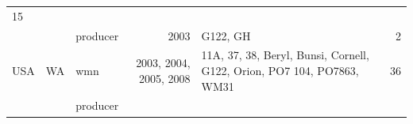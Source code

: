 \begin{longtable}[]{@{}lllrlr@{}}
\begin{minipage}[t]{0.04\columnwidth}
15\strut
\end{minipage}\tabularnewline
\begin{minipage}[t]{0.11\columnwidth}\raggedright\strut
\strut
\end{minipage} & \begin{minipage}[t]{0.08\columnwidth}\raggedright\strut
\strut
\end{minipage} & \begin{minipage}[t]{0.12\columnwidth}\raggedright\strut
producer\strut
\end{minipage} & \begin{minipage}[t]{0.19\columnwidth}\raggedleft\strut
2003\strut
\end{minipage} & \begin{minipage}[t]{0.29\columnwidth}\raggedright\strut
G122, GH\strut
\end{minipage} & \begin{minipage}[t]{0.04\columnwidth}\raggedleft\strut
2\strut
\end{minipage}\tabularnewline
\begin{minipage}[t]{0.11\columnwidth}\raggedright\strut
USA\strut
\end{minipage} & \begin{minipage}[t]{0.08\columnwidth}\raggedright\strut
WA\strut
\end{minipage} & \begin{minipage}[t]{0.12\columnwidth}\raggedright\strut
wmn\strut
\end{minipage} & \begin{minipage}[t]{0.19\columnwidth}\raggedleft\strut
2003, 2004, 2005, 2008\strut
\end{minipage} & \begin{minipage}[t]{0.29\columnwidth}\raggedright\strut
11A, 37, 38, Beryl, Bunsi, Cornell, G122, Orion, PO7 104, PO7863,
WM31\strut
\end{minipage} & \begin{minipage}[t]{0.04\columnwidth}\raggedleft\strut
36\strut
\end{minipage}\tabularnewline
\begin{minipage}[t]{0.11\columnwidth}\raggedright\strut
\strut
\end{minipage} & \begin{minipage}[t]{0.08\columnwidth}\raggedright\strut
\strut
\end{minipage} & \begin{minipage}[t]{0.12\columnwidth}\raggedright\strut
producer\strut
\end{minipage} & \begin{minipage}[t]{0.19\columnwidth}\raggedleft\strut

\end{minipage}
\end{longtable}

